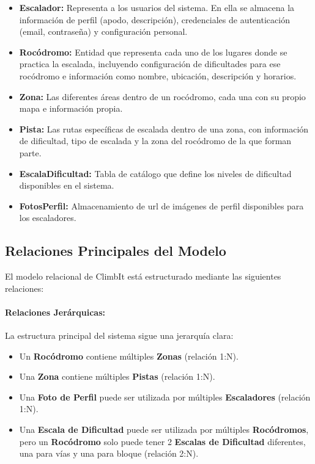 \begin{itemize}
    \item \textbf{Escalador:} Representa a los usuarios del sistema. En ella se almacena la información de perfil (apodo, descripción),
    credenciales de autenticación (email, contraseña) y configuración personal.
    
    \item \textbf{Rocódromo:} Entidad que representa cada uno de los lugares donde se practica la escalada, incluyendo configuración de dificultades
    para ese rocódromo e información como nombre, ubicación, descripción y horarios.
    
    \item \textbf{Zona:} Las diferentes áreas dentro de un rocódromo, cada una con su propio mapa e información propia.
    
    \item \textbf{Pista:} Las rutas específicas de escalada dentro de una zona, con información de dificultad, tipo de escalada y la zona del rocódromo
    de la que forman parte. 
    
    \item \textbf{EscalaDificultad:} Tabla de catálogo que define los niveles de dificultad disponibles en el sistema.
    
    \item \textbf{FotosPerfil:} Almacenamiento de url de imágenes de perfil disponibles para los escaladores.
\end{itemize}

\subsection{Relaciones Principales del Modelo}

El modelo relacional de ClimbIt está estructurado mediante las siguientes relaciones:

\paragraph{Relaciones Jerárquicas:} La estructura principal del sistema sigue una jerarquía clara:
\begin{itemize}
    \item Un \textbf{Rocódromo} contiene múltiples \textbf{Zonas} (relación 1:N).
     
    \item Una \textbf{Zona} contiene múltiples \textbf{Pistas} (relación 1:N).
     
    \item Una \textbf{Foto de Perfil} puede ser utilizada por múltiples \textbf{Escaladores} (relación 1:N).
     
    \item Una \textbf{Escala de Dificultad} puede ser utilizada por múltiples \textbf{Rocódromos}, pero un \textbf{Rocódromo} solo puede tener 2 \textbf{Escalas de Dificultad} diferentes,
    una para vías y una para bloque (relación 2:N).
\end{itemize}

